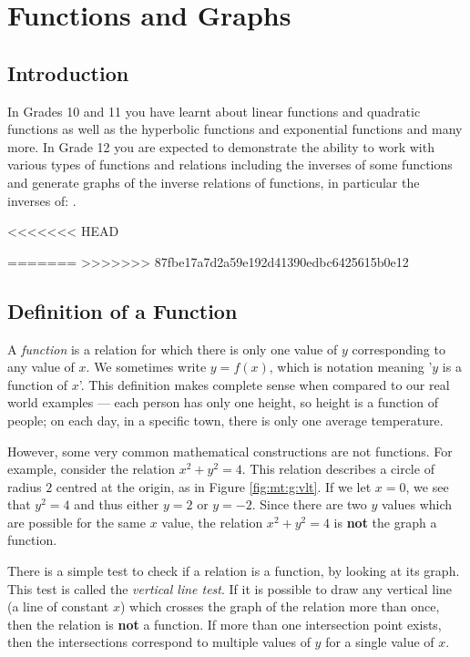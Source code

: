 \chapter{Functions and Graphs}
\label{m:fg12}

\section{Introduction}
\label{m:fg12:i}
In Grades 10 and 11 you have learnt about linear functions and quadratic functions as well as the hyperbolic functions and exponential functions and many more.  In Grade 12 you are expected to demonstrate the ability to work with
various types of functions and  relations including  the inverses of some functions and generate graphs of the
inverse relations of functions, in particular the  inverses of:
.

<<<<<<< HEAD

=======
>>>>>>> 87fbe17a7d2a59e192d41390edbc6425615b0e12
\section{Definition of a Function}
A \textit{function} is a relation for which there is only one value of $y$ corresponding to any value of $x$. We sometimes write $y=f(x)$, which is notation meaning '$y$ is a function of $x$'. This definition makes complete sense when compared to our real world examples --- each person has only one height, so height is a function of people; on each day, in a specific town, there is only one average temperature.

However, some very common  mathematical constructions are not functions. For example, consider the relation $x^2+y^2=4$. This relation describes a circle of radius $2$ centred at the origin, as in Figure \ref{fig:mt:g:vlt}. If we let $x=0$, we see that $y^2=4$ and thus either $y=2$ or $y=-2$. Since there are two $y$ values which are possible for the same $x$ value, the relation $x^2+y^2=4$ is \textbf{not} the graph a function.

There is a simple test to check if a relation is a function, by looking at its graph. This test is called the \textit{vertical line test}. If it is possible to draw any vertical line (a line of constant $x$) which crosses the graph of the relation more than once, then the relation is \textbf{not} a function. If more than one intersection point exists, then the intersections correspond to multiple values of $y$ for a single value of $x$.


